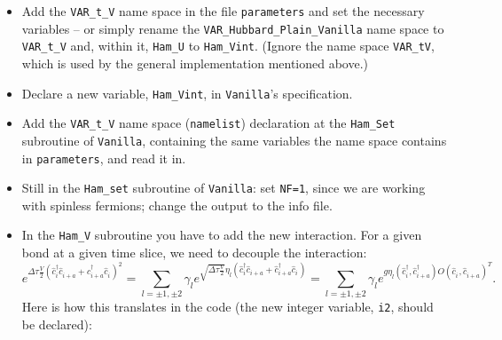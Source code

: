 \documentclass[10pt,modern]{scrartcl}
\numberwithin{exerciseitem}{exercise} %
\begin{document}
\begin{itemize}
\item  Add the \texttt{VAR\_t\_V} name space in the file \texttt{parameters} and set the necessary variables -- or simply rename the \texttt{VAR\_Hubbard\_Plain\_Vanilla} name space to \texttt{VAR\_t\_V} and, within it, \texttt{Ham\_U} to \texttt{Ham\_Vint}. (Ignore the name space \texttt{VAR\_tV}, which is used by the general implementation mentioned above.)
\item  Declare a new variable, \texttt{Ham\_Vint}, in \texttt{Vanilla}'s specification.
\item Add the \texttt{VAR\_t\_V} name space (\texttt{namelist}) declaration at the \texttt{Ham\_Set} subroutine of \texttt{Vanilla}, containing the same variables the name space contains in \texttt{parameters}, and read it in.
\item  Still in the  \texttt{Ham\_set} subroutine of \texttt{Vanilla}: set \texttt{NF=1}, since we are working with spinless fermions; change the
output to the info file.
\item  In the \texttt{Ham\_V} subroutine you have to add the new interaction. For a given bond at a given time slice, we need to decouple the interaction: 
\begin{equation}
e^{\Delta \tau \frac{V}{2} \left( \hat{c}^{\dagger}_{i}  \hat{c}^{\phantom\dagger}_{i+a}      + \hat{c}^{\dagger}_{i+a}  \hat{c}^{\phantom\dagger}_{i} \right)^2} = 
\sum_{l= \pm1, \pm 2} \gamma_l e^{ \sqrt{\Delta \tau \frac{V}{2}}  \eta_l   \left( \hat{c}^{\dagger}_{i}  \hat{c}^{\phantom\dagger}_{i+a}      + \hat{c}^{\dagger}_{i+a}  \hat{c}^{\phantom\dagger}_{i} \right) } =  \sum_{l= \pm1, \pm 2} \gamma_l e^{ g  \eta_l   \left( \hat{c}^{\dagger}_{i},  \hat{c}^{\dagger}_{i+a}  \right)  O 
    \left(\hat{c}^{\phantom\dagger}_{i},  \hat{c}^{\phantom\dagger}_{i+a} \right)^{T} }.
\end{equation}
 Here is  how this translates in the code (the new integer variable, \texttt{i2}, should be declared): 
 

\end{itemize}
\end{document}
